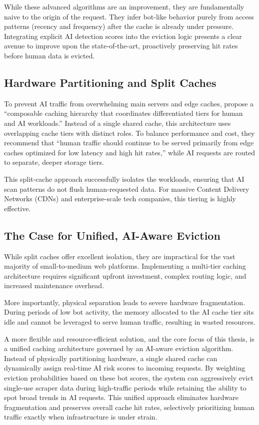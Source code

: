 While these advanced algorithms are an improvement, they are fundamentally naive to the origin of the request. They infer bot-like behavior purely from access patterns (recency and frequency) after the cache is already under pressure. Integrating explicit AI detection scores into the eviction logic presents a clear avenue to improve upon the state-of-the-art, proactively preserving hit rates before human data is evicted.

\subsection{Hardware Partitioning and Split Caches}
To prevent AI traffic from overwhelming main servers and edge caches,  propose a ``composable caching hierarchy that coordinates differentiated tiers for human and AI workloads.'' Instead of a single shared cache, this architecture uses overlapping cache tiers with distinct roles. To balance performance and cost, they recommend that ``human traffic should continue to be served primarily from edge caches optimized for low latency and high hit rates,'' while AI requests are routed to separate, deeper storage tiers.

This split-cache approach successfully isolates the workloads, ensuring that AI scan patterns do not flush human-requested data. For massive Content Delivery Networks (CDNs) and enterprise-scale tech companies, this tiering is highly effective.

\subsection{The Case for Unified, AI-Aware Eviction}
While split caches offer excellent isolation, they are impractical for the vast majority of small-to-medium web platforms. Implementing a multi-tier caching architecture requires significant upfront investment, complex routing logic, and increased maintenance overhead.

More importantly, physical separation leads to severe hardware fragmentation. During periods of low bot activity, the memory allocated to the AI cache tier sits idle and cannot be leveraged to serve human traffic, resulting in wasted resources. 

A more flexible and resource-efficient solution, and the core focus of this thesis, is a unified caching architecture governed by an AI-aware eviction algorithm. Instead of physically partitioning hardware, a single shared cache can dynamically assign real-time AI risk scores to incoming requests. By weighting eviction probabilities based on these bot scores, the system can aggressively evict single-use scraper data during high-traffic periods while retaining the ability to spot broad trends in AI requests. This unified approach eliminates hardware fragmentation and preserves overall cache hit rates, selectively prioritizing human traffic exactly when infrastructure is under strain.

